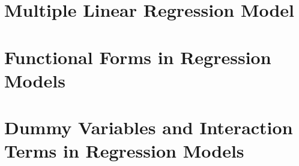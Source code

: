 \documentclass{./../../Latex/notes}
\numberwithin{section}{chapter}
\numberwithin{subsection}{section}
\begin{document}
\chapter{Multiple Linear Regression Model}
\vspace{-6cm}


\chapter{Functional Forms in Regression Models}
\vspace{-6cm}


\chapter{Dummy Variables and Interaction Terms in Regression Models}
\vspace{-6cm}

\end{document}
